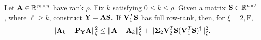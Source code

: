 \begin{lemma}
\label{chprelim:lem:structural-result2}
Let $\mathbf{A} \in \mathbb{R}^{m \times n}$ have rank $\rho.$ Fix $k$ satisfying $0 \leq k \leq \rho$.
Given a matrix $\mathbf{S} \in \mathbb{R}^{n \times \ell}$, where $\ell \ge k$, construct $\mathbf{Y} = \mathbf{A} \mathbf{S}.$
If $\mathbf{V}_1 ^T \mathbf{S}$ has full row-rank, then,
for $\xi=2, \mathrm{F}$,
\begin{equation}
\label{ch3:eqn:tropp-structural-result2a}
\mbox{}\|\mathbf{A}_k - \mathbf{P}_{\mathbf{Y}} \mathbf{A}\|_{\xi}^2 \leq  \mbox{}\|\mathbf{A} - \mathbf{A}_k\|_{\xi}^2 +
\mbox{}\|\mathbf{\Sigma}_2 \mathbf{V}_2 ^T \mathbf{S} ( \mathbf{V}_1 ^T \mathbf{S})^\dagger \|_{\xi}^2.
\end{equation}
\end{lemma}

